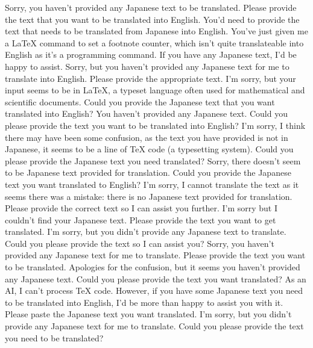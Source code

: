 {%
Sorry, you haven't provided any Japanese text to be translated. Please provide the text that you want to be translated into English.
You'd need to provide the text that needs to be translated from Japanese into English. You've just given me a LaTeX command to set a footnote counter, which isn't quite translateable into English as it's a programming command. If you have any Japanese text, I'd be happy to assist.
Sorry, but you haven't provided any Japanese text for me to translate into English. Please provide the appropriate text.
I'm sorry, but your input seems to be in LaTeX, a typeset language often used for mathematical and scientific documents. Could you provide the Japanese text that you want translated into English?
You haven't provided any Japanese text. Could you please provide the text you want to be translated into English?
I'm sorry, I think there may have been some confusion, as the text you have provided is not in Japanese, it seems to be a line of TeX code (a typesetting system). Could you please provide the Japanese text you need translated?
Sorry, there doesn't seem to be Japanese text provided for translation. Could you provide the Japanese text you want translated to English?
I'm sorry, I cannot translate the text as it seems there was a mistake: there is no Japanese text provided for translation. Please provide the correct text so I can assist you further.
I'm sorry but I couldn't find your Japanese text. Please provide the text you want to get translated.
I'm sorry, but you didn't provide any Japanese text to translate. Could you please provide the text so I can assist you?
Sorry, you haven't provided any Japanese text for me to translate. Please provide the text you want to be translated.
Apologies for the confusion, but it seems you haven't provided any Japanese text. Could you please provide the text you want translated?
As an AI, I can't process TeX code. However, if you have some Japanese text you need to be translated into English, I'd be more than happy to assist you with it. Please paste the Japanese text you want translated.
I'm sorry, but you didn't provide any Japanese text for me to translate. Could you please provide the text you need to be translated?
}

